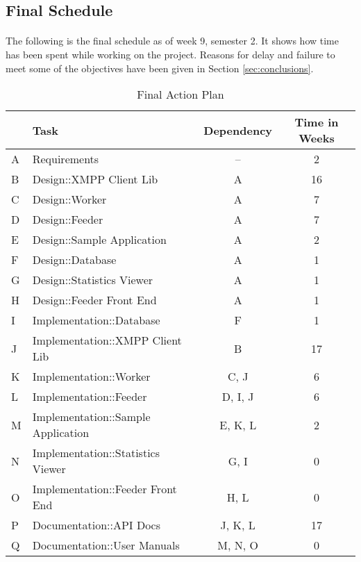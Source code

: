 \subsection{Final Schedule}
\paragraph{}
The following is the final schedule as of week 9, semester 2. It shows how time has been spent while working on the project. Reasons for delay and failure to meet some of the objectives have been given in Section \ref{sec:conclusions}.

\begin{table}[H]
\begin{tabularx}{\linewidth}{llcc}
\toprule
\textbf{} & \textbf{Task} & \textbf{Dependency} & \textbf{Time in Weeks} \\
\midrule
\endhead
A & Requirements                       & --      & 2  \\
B & Design::XMPP Client Lib            & A       & 16 \\
C & Design::Worker                     & A       & 7  \\
D & Design::Feeder                     & A       & 7  \\
E & Design::Sample Application         & A       & 2  \\
F & Design::Database                   & A       & 1  \\
G & Design::Statistics Viewer          & A       & 1  \\
H & Design::Feeder Front End           & A       & 1  \\
I & Implementation::Database           & F       & 1  \\
J & Implementation::XMPP Client Lib    & B       & 17 \\
K & Implementation::Worker             & C, J    & 6  \\
L & Implementation::Feeder             & D, I, J & 6  \\
M & Implementation::Sample Application & E, K, L & 2  \\
N & Implementation::Statistics Viewer  & G, I    & 0  \\
O & Implementation::Feeder Front End   & H, L    & 0  \\
P & Documentation::API Docs            & J, K, L & 17 \\
Q & Documentation::User Manuals        & M, N, O & 0  \\
\bottomrule
\end{tabularx}
\caption{Final Action Plan}
\label{tab:fin_actionplan}
\end{table}

